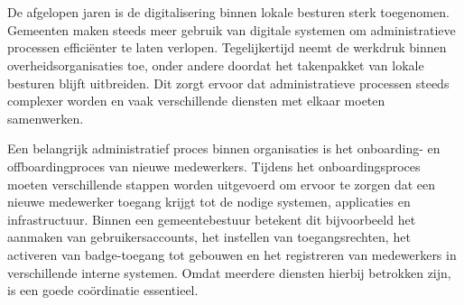
\chapter{}%
\label{ch:inleiding}



De afgelopen jaren is de digitalisering binnen lokale besturen sterk toegenomen. Gemeenten maken steeds meer gebruik van digitale systemen om administratieve processen efficiënter te laten verlopen. Tegelijkertijd neemt de werkdruk binnen overheidsorganisaties toe, onder andere doordat het takenpakket van lokale besturen blijft uitbreiden. Dit zorgt ervoor dat administratieve processen steeds complexer worden en vaak verschillende diensten met elkaar moeten samenwerken. \newline

Een belangrijk administratief proces binnen organisaties is het onboarding- en offboardingproces van nieuwe medewerkers. Tijdens het onboardingsproces moeten verschillende stappen worden uitgevoerd om ervoor te zorgen dat een nieuwe medewerker toegang krijgt tot de nodige systemen, applicaties en infrastructuur. Binnen een gemeentebestuur betekent dit bijvoorbeeld het aanmaken van gebruikersaccounts, het instellen van toegangsrechten, het activeren van badge-toegang tot gebouwen en het registreren van medewerkers in verschillende interne systemen. Omdat meerdere diensten hierbij betrokken zijn, is een goede coördinatie essentieel. 

